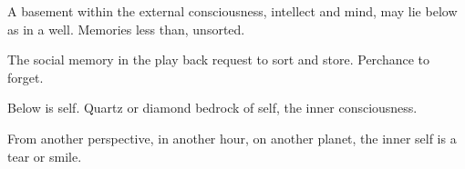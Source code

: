 

A basement within the external consciousness, intellect and mind, may
lie below as in a well.  Memories less than, unsorted.

The social memory in the play back request to sort and store.
Perchance to forget.

Below is self.  Quartz or diamond bedrock of self, the inner
consciousness.

From another perspective, in another hour, on another planet, the
inner self is a tear or smile.

\bye

